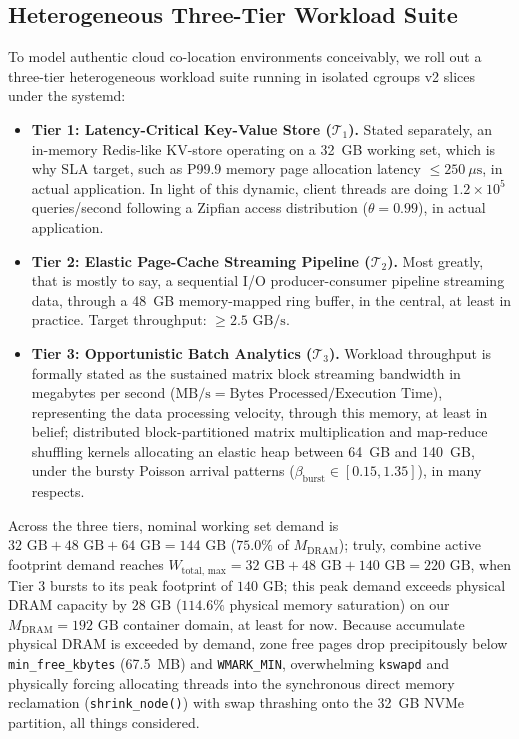 \documentclass[pdflatex,sn-mathphys,Numbered]{sn-jnl}
\begin{document}


\subsection{Heterogeneous Three-Tier Workload Suite}
To model authentic cloud co-location environments conceivably, we roll out a three-tier heterogeneous workload suite running in isolated cgroups v2 slices under the systemd:
\begin{itemize}
    \item \textbf{Tier 1: Latency-Critical Key-Value Store ($\mathcal{T}_1$).} Stated separately, an in-memory Redis-like KV-store operating on a 32~GB working set, which is why SLA target, such as P99.9 memory page allocation latency $\le 250\ \mu\text{s}$, in actual application. In light of this dynamic, client threads are doing $1.2 \times 10^5$ queries/second following a Zipfian access distribution ($\theta = 0.99$), in actual application.
    \item \textbf{Tier 2: Elastic Page-Cache Streaming Pipeline ($\mathcal{T}_2$).} Most greatly, that is mostly to say, a sequential I/O producer-consumer pipeline streaming data, through a 48~GB memory-mapped ring buffer, in the central, at least in practice. Target throughput: $\ge 2.5\text{ GB/s}$.
    \item \textbf{Tier 3: Opportunistic Batch Analytics ($\mathcal{T}_3$).} Workload throughput is formally stated as the sustained matrix block streaming bandwidth in megabytes per second ($\text{MB/s} = \text{Bytes Processed} / \text{Execution Time}$), representing the data processing velocity, through this memory, at least in belief; distributed block-partitioned matrix multiplication and map-reduce shuffling kernels allocating an elastic heap between 64~GB and 140~GB, under the bursty Poisson arrival patterns ($\beta_{\text{burst}} \in [0.15, 1.35]$), in many respects.
\end{itemize}
Across the three tiers, nominal working set demand is $32\text{ GB} + 48\text{ GB} + 64\text{ GB} = 144\text{ GB}$ ($75.0\%$ of $M_{\text{DRAM}}$); truly, combine active footprint demand reaches $W_{\text{total, max}} = 32\text{ GB} + 48\text{ GB} + 140\text{ GB} = 220\text{ GB}$, when Tier 3 bursts to its peak footprint of $140\text{ GB}$; this peak demand exceeds physical DRAM capacity by $28\text{ GB}$ ($114.6\%$ physical memory saturation) on our $M_{\text{DRAM}} = 192\text{ GB}$ container domain, at least for now. Because accumulate physical DRAM is exceeded by demand, zone free pages drop precipitously below \texttt{min\_free\_kbytes} (67.5~MB) and \texttt{WMARK\_MIN}, overwhelming \texttt{kswapd} and physically forcing allocating threads into the synchronous direct memory reclamation (\texttt{shrink\_node()}) with swap thrashing onto the 32~GB NVMe partition, all things considered.
\end{document}
